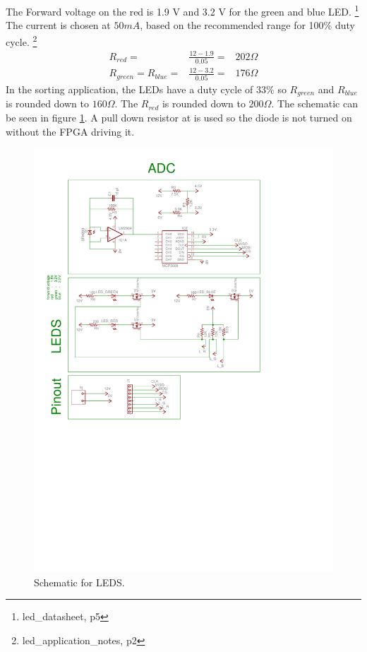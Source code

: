 The Forward voltage on the red is 1.9 V and 3.2 V for the green and blue LED.
\footnote{led\_datasheet, p5}
The current is chosen at $50 mA$, based on the recommended range for 100\% duty cycle.
\footnote{led\_application\_notes, p2}
\begin{eqnarray}
 R_{red} =& \frac{12-1.9}{0.05} =& 202 \Omega \nonumber \\
 R_{green} = R_{blue} =& \frac{12-3.2}{0.05} =& 176 \Omega \nonumber 
\end{eqnarray}
In the sorting application, the LEDs have a duty cycle of 33\% so $R_{green}$ and $R_{blue}$ is rounded down to $160 \Omega$.
The $R_{red}$ is rounded down to $200\Omega$.
The schematic can be seen in figure \ref{fig:sch_led}.
A pull down resistor at is used so the diode is not turned on without the FPGA driving it.

\begin{figure}[ht]
\centering
 \includegraphics[scale=0.9,trim={2.4cm 14cm 5.1cm 9cm},clip]{img/adc_schematic.pdf}
  \caption{Schematic for LEDS.}
  \label{fig:sch_led}
\end{figure}

